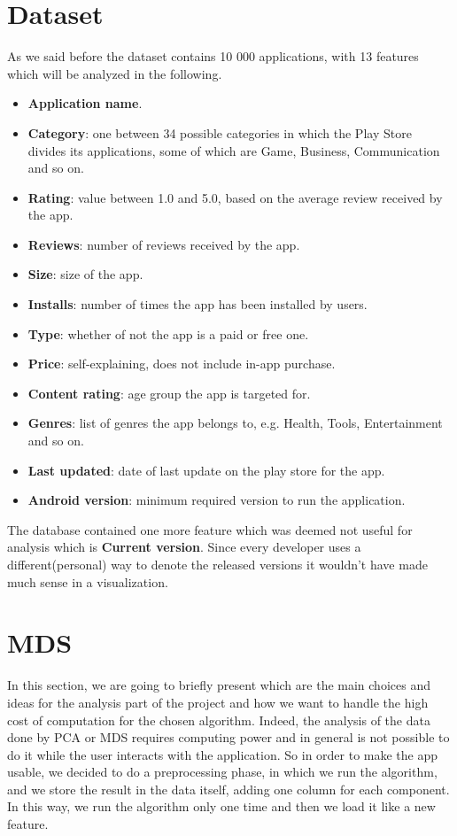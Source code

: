 \documentclass[a4paper, 11pt]{article}
\begin{document}
\section{Dataset}
As we said before the dataset contains 10 000 applications, with 13 features which will be analyzed in the following.
\begin{itemize}
\item \textbf{Application name}.
\item \textbf{Category}: one between 34 possible categories in which the Play Store divides its applications, some of which are Game, Business, Communication and so on.
\item \textbf{Rating}: value between 1.0 and 5.0, based on the average review received by the app.
\item \textbf{Reviews}: number of reviews received by the app.
\item \textbf{Size}: size of the app.
\item \textbf{Installs}: number of times the app has been installed by users.
\item \textbf{Type}: whether of not the app is a paid or free one.
\item \textbf{Price}: self-explaining, does not include in-app purchase.
\item \textbf{Content rating}: age group the app is targeted for.
\item \textbf{Genres}: list of genres the app belongs to, e.g. Health, Tools, Entertainment and so on.
\item \textbf{Last updated}: date of last update on the play store for the app.
\item \textbf{Android version}: minimum required version to run the application.
\end{itemize}
The database contained one more feature which was deemed not useful for analysis which is \textbf{Current version}. Since every developer uses a different(personal) way to denote the released versions it wouldn't have made much sense in a visualization.

\section{MDS}

In this section, we are going to briefly present which are the main choices and ideas for the analysis part of the project and how we want to handle the high cost of computation for the chosen algorithm.   
Indeed, the analysis of the data done by PCA or MDS requires computing power and in general is not possible to do it while the user interacts with the application. 
So in order to make the app usable, we decided to do a preprocessing phase, in which we run the algorithm, and we store the result in the data itself, adding one column for each component. In this way, we run the algorithm only one time and then we load it like a new feature. \\
\end{document}
